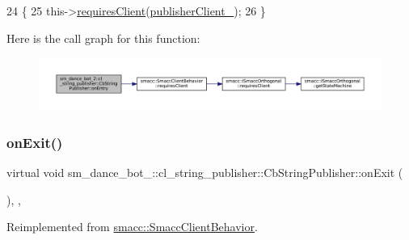 \begin{DoxyCode}
24     \{
25         this->\hyperlink{classsmacc_1_1SmaccClientBehavior_a917f001e763a1059af337bf4e164f542}{requiresClient}(\hyperlink{classsm__dance__bot__2_1_1cl__string__publisher_1_1CbStringPublisher_a374db0f8b7ae20321f38c611108cb49a}{publisherClient\_});
26     \}
\end{DoxyCode}
Here is the call graph for this function\+:
\nopagebreak
\begin{figure}[H]
\begin{center}
\leavevmode
\includegraphics[width=350pt]{classsm__dance__bot__2_1_1cl__string__publisher_1_1CbStringPublisher_abc3c362ea55110f8d340e5cb4d901892_cgraph}
\end{center}
\end{figure}
\mbox{\label{classsm__dance__bot__2_1_1cl__string__publisher_1_1CbStringPublisher_aee990acdb5ec33f1d22efafbe32216f2}} 
\subsubsection{\texorpdfstring{on\+Exit()}{onExit()}}
{\footnotesize\ttfamily virtual void sm\+\_\+dance\+\_\+bot\+\_\+::cl\+\_\+string\+\_\+publisher\+::\+Cb\+String\+Publisher\+::on\+Exit (\begin{DoxyParamCaption}{ }\end{DoxyParamCaption})\hspace{0.3cm}{\ttfamily [inline]}, {\ttfamily [override]}, {\ttfamily [virtual]}}



Reimplemented from \hyperlink{classsmacc_1_1SmaccClientBehavior_ac0cd72d42bd00425362a97c9803ecce5}{smacc\+::\+Smacc\+Client\+Behavior}.



